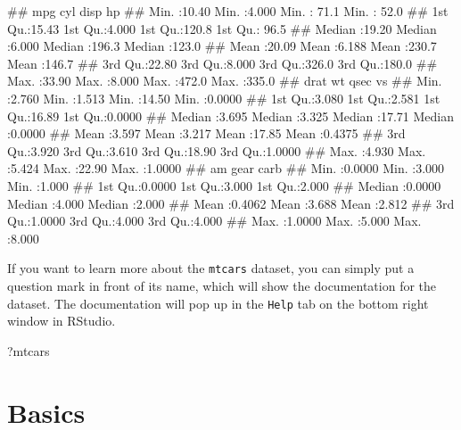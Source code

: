 \documentclass[
]{book}
\newenvironment{Shaded}{\begin{snugshade}}{\end{snugshade}}
\newcommand{\NormalTok}[1]{#1}
\begin{document}
\begin{Shaded}
\begin{Highlighting}[]
\NormalTok{\#\#       mpg             cyl             disp             hp       }
\NormalTok{\#\#  Min.   :10.40   Min.   :4.000   Min.   : 71.1   Min.   : 52.0  }
\NormalTok{\#\#  1st Qu.:15.43   1st Qu.:4.000   1st Qu.:120.8   1st Qu.: 96.5  }
\NormalTok{\#\#  Median :19.20   Median :6.000   Median :196.3   Median :123.0  }
\NormalTok{\#\#  Mean   :20.09   Mean   :6.188   Mean   :230.7   Mean   :146.7  }
\NormalTok{\#\#  3rd Qu.:22.80   3rd Qu.:8.000   3rd Qu.:326.0   3rd Qu.:180.0  }
\NormalTok{\#\#  Max.   :33.90   Max.   :8.000   Max.   :472.0   Max.   :335.0  }
\NormalTok{\#\#       drat             wt             qsec             vs        }
\NormalTok{\#\#  Min.   :2.760   Min.   :1.513   Min.   :14.50   Min.   :0.0000  }
\NormalTok{\#\#  1st Qu.:3.080   1st Qu.:2.581   1st Qu.:16.89   1st Qu.:0.0000  }
\NormalTok{\#\#  Median :3.695   Median :3.325   Median :17.71   Median :0.0000  }
\NormalTok{\#\#  Mean   :3.597   Mean   :3.217   Mean   :17.85   Mean   :0.4375  }
\NormalTok{\#\#  3rd Qu.:3.920   3rd Qu.:3.610   3rd Qu.:18.90   3rd Qu.:1.0000  }
\NormalTok{\#\#  Max.   :4.930   Max.   :5.424   Max.   :22.90   Max.   :1.0000  }
\NormalTok{\#\#        am              gear            carb      }
\NormalTok{\#\#  Min.   :0.0000   Min.   :3.000   Min.   :1.000  }
\NormalTok{\#\#  1st Qu.:0.0000   1st Qu.:3.000   1st Qu.:2.000  }
\NormalTok{\#\#  Median :0.0000   Median :4.000   Median :2.000  }
\NormalTok{\#\#  Mean   :0.4062   Mean   :3.688   Mean   :2.812  }
\NormalTok{\#\#  3rd Qu.:1.0000   3rd Qu.:4.000   3rd Qu.:4.000  }
\NormalTok{\#\#  Max.   :1.0000   Max.   :5.000   Max.   :8.000}
\end{Highlighting}
\end{Shaded}

\hfill\break
If you want to learn more about the \texttt{mtcars} dataset, you can simply put a question mark in front of its name, which will show the documentation for the dataset. The documentation will pop up in the \texttt{Help} tab on the bottom right window in RStudio.

\begin{Shaded}
\begin{Highlighting}[]
\NormalTok{?mtcars}
\end{Highlighting}
\end{Shaded}

\chapter{Basics}\label{basics}
\end{document}
